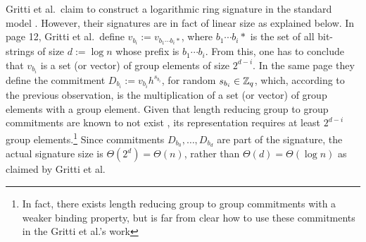 
Gritti et al.~claim to construct a logarithmic ring signature in the standard model \cite{IET:GriSusPla16}. However, their signatures are in fact of linear size as explained below.
In page 12, Gritti et al.~define $v_{b_i} := v_{b_1\cdots b_i *}$, where $b_1\cdots b_i *$ is the set of all bit-strings of size $d:=\log n$ whose prefix is $b_1\cdots b_i$. From this, one has to conclude that $v_{b_i}$ is a set (or vector) of group elements of size $2^{d-i}$.
In the same page they define the commitment $D_{b_i} := v_{b_i}h^{s_{b_i}}$, for random $s_{b_i}\in\mathbb{Z}_q$, which, according to the previous observation, is the multiplication of a set (or vector) of group elements with a group element. Given that length reducing group to group commitments are known to not exist \cite{EC:AbeHarOhk12}, its representation requires at least $2^{d-i}$ group elements.\footnote{In fact, there exists length reducing group to group commitments \cite{EC:AKOT15} with a weaker binding property, but is far from clear how to use these commitments in the Gritti et al.'s work} Since commitments $D_{b_0},\ldots,D_{b_d}$ are part of the signature, the actual signature size is $\Theta(2^d)=\Theta(n)$, rather than  $\Theta(d)=\Theta(\log n)$ as claimed by Gritti et al.


